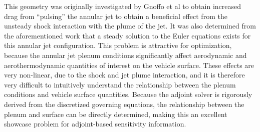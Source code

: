 This geometry was originally investigated by Gnoffo et
al\cite{gnoffo2016tapping} to obtain increased drag from ``pulsing'' the annular
jet to obtain a beneficial effect from the unsteady shock interaction with the
plume of the jet.  It was also determined from the aforementioned work that a
steady solution to the Euler equations exists for this annular jet
configuration.  This problem is attractive for optimization, because the annular
jet plenum conditions significantly affect aerodynamic and aerothermodynamic
quantities of interest on the vehicle surface.  These effects are very
non-linear, due to the shock and jet plume interaction, and it is therefore very
difficult to intuitively understand the relationship between the plenum
conditions and vehicle surface quantities.  Because the adjoint solver is
rigorously derived from the discretized governing equations, the relationship
between the plenum and surface can be directly determined, making this an
excellent showcase problem for adjoint-based sensitivity information.

